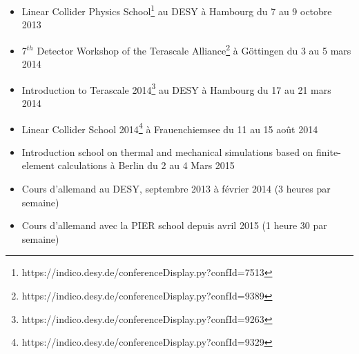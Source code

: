   \begin{itemize}
    \item Linear Collider Physics School\footnote{https://indico.desy.de/conferenceDisplay.py?confId=7513} au DESY à Hambourg du 7 au 9 octobre 2013
    \item 7$^{th}$ Detector Workshop of the Terascale Alliance\footnote{https://indico.desy.de/conferenceDisplay.py?confId=9389} à Göttingen du 3 au 5 mars 2014
    \item Introduction to Terascale 2014\footnote{https://indico.desy.de/conferenceDisplay.py?confId=9263} au DESY à Hambourg du 17 au 21 mars 2014
    \item Linear Collider School 2014\footnote{https://indico.desy.de/conferenceDisplay.py?confId=9329} à Frauenchiemsee du 11 au 15 août 2014
    \item Introduction school on thermal and mechanical simulations based on finite-element calculations à Berlin du 2 au 4 Mars 2015
    \item Cours d'allemand au DESY, septembre 2013 à février 2014 (3 heures par semaine)
    \item Cours d'allemand avec la PIER school depuis avril 2015 (1 heure 30 par semaine)
  \end{itemize}
